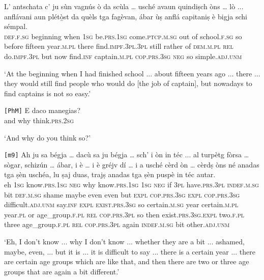\begin{linenumbers}
	\gll L’ antschata c’ ju sùn vagnús ò da scùla … usché avaun quindiṣch òns … lò ... anflávani aun plétò̱st da quèls tga fagèvan, ábar ùṣ anflá capitaniṣ è bigja schi sémpal.   \\
\textsc{def.f.sg} beginning when \textsc{1sg} be.\textsc{prs.1sg} come.\textsc{ptcp.m.sg} out of school.\textsc{f.sg} {} so before fifteen year.\textsc{m.pl} {} there {} find.\textsc{impf.3pl.3pl} still rather of \textsc{dem.m.pl} \textsc{rel} do.\textsc{impf.3pl} but now find.\textsc{inf} captain.\textsc{m.pl} \textsc{cop.prs.3sg} \textsc{neg} so simple.\textsc{adj.unm}\\
\end{linenumbers}
\medskip
\glt `At the beginning when I had finished school ... about fifteen years ago ... there ... they would still find people who would do [the job of captain], but nowadays to find captains is not so easy.'
\medskip

\begin{linenumbers}
	\gll  \texttt{[PhM]} E daco manegias?\\
	{} and why think.\textsc{prs.2sg}\\
\end{linenumbers}
\medskip
\glt `And why do you think so?'

\begin{linenumbers}
	\gll \texttt{[m9]} Ah ju sa bégja … dacù sa ju bégja … sch’ i òn in téc ... al turpètg fòrsa … sògar, schizún\footnotemark{} … ábar, i è … i è gréjv dí … i a usché cèrd òn … cèrdṣ òns né anadas tga ṣèn uschéa, lu ṣaj duas, trajṣ anadas tga ṣèn puspè in téc autar.\\
{} eh \textsc{1sg} know.\textsc{prs.1sg} \textsc{neg} {} why know.\textsc{prs.1sg} \textsc{1sg} \textsc{neg} {} if \textsc{3pl} have.\textsc{prs.3pl} \textsc{indef.m.sg} bit {} \textsc{def.m.sg} shame maybe {} even even {} but \textsc{expl} \textsc{cop.prs.3sg} {} \textsc{expl} \textsc{cop.prs.3sg} difficult.\textsc{adj.unm} say.\textsc{inf} {} \textsc{expl} \textsc{exist.prs.3sg} so certain.\textsc{m.sg} year {} certain.\textsc{m.pl} year.\textsc{pl} or age\_group.\textsc{f.pl} \textsc{rel} \textsc{cop.prs.3pl} so then exist.\textsc{prs.3sg.expl} two.\textsc{f.pl} three age\_group.\textsc{f.pl} \textsc{rel} \textsc{cop.prs.3pl} again \textsc{indef.m.sg} bit other.\textsc{adj.unm}\\
\end{linenumbers}
\medskip
\glt `Eh, I don't know ... why I don't know ... whether they are a bit ... ashamed, maybe, even, ... but it is ... it is difficult to say ... there is a certain year ... there are certain age groups which are like that, and then there are two or three age groups that are again a bit different.'
\medskip

